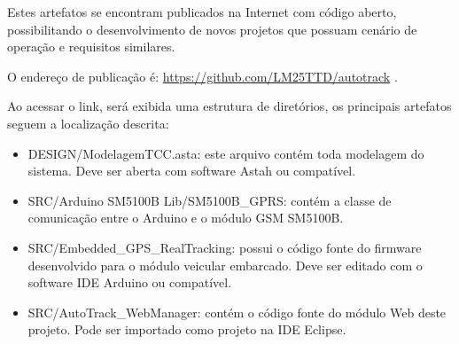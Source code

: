 Estes artefatos se encontram publicados na Internet com código aberto, possibilitando o desenvolvimento de novos projetos que possuam cenário de operação e requisitos similares.

O endereço de publicação é: \url{https://github.com/LM25TTD/autotrack} .

Ao acessar o link, será exibida uma estrutura de diretórios, os principais artefatos seguem a localização descrita:

\begin{itemize}
	\item DESIGN/ModelagemTCC.asta: este arquivo contém toda modelagem do sistema. Deve ser aberta com software Astah ou compatível.
	\item SRC/Arduino SM5100B Lib/SM5100B\_GPRS: contém a classe de comunicação entre o Arduino e o módulo GSM SM5100B.
	\item SRC/Embedded\_GPS\_RealTracking: possui o código fonte do firmware desenvolvido para o módulo veicular embarcado. Deve ser editado com o software IDE Arduino ou compatível. 
	\item SRC/AutoTrack\_WebManager: contém o código fonte do módulo Web deste projeto. Pode ser importado como projeto na IDE Eclipse.
\end{itemize} 
